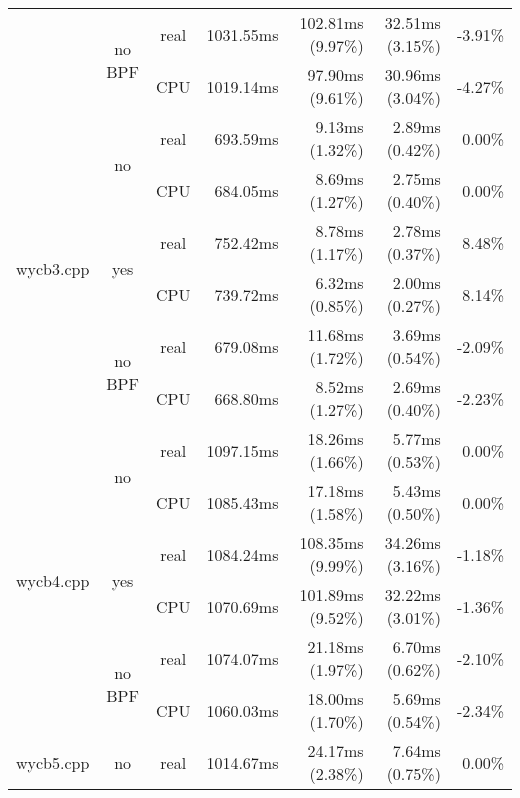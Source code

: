 \documentclass[en]{pracamgr}
\begin{document}
\begin{appendices}
\begin{small}
\begin{longtable}{|l|c|c|r|r|r|r|}
                            \cline{2-7}
                            & \multirow{2}{*}{no BPF} & real & 1031.55ms & 102.81ms (9.97\%) & 32.51ms (3.15\%) & -3.91\% \\*
                            &                         & CPU  & 1019.14ms & 97.90ms (9.61\%) & 30.96ms (3.04\%) & -4.27\% \\
\hline
\multirow{6}{*}{wycb3.cpp}  & \multirow{2}{*}{no}     & real & 693.59ms & 9.13ms (1.32\%) & 2.89ms (0.42\%) & 0.00\% \\*
                            &                         & CPU  & 684.05ms & 8.69ms (1.27\%) & 2.75ms (0.40\%) & 0.00\% \\*
                            \cline{2-7}
                            & \multirow{2}{*}{yes}    & real & 752.42ms & 8.78ms (1.17\%) & 2.78ms (0.37\%) & 8.48\% \\*
                            &                         & CPU  & 739.72ms & 6.32ms (0.85\%) & 2.00ms (0.27\%) & 8.14\% \\*
                            \cline{2-7}
                            & \multirow{2}{*}{no BPF} & real & 679.08ms & 11.68ms (1.72\%) & 3.69ms (0.54\%) & -2.09\% \\*
                            &                         & CPU  & 668.80ms & 8.52ms (1.27\%) & 2.69ms (0.40\%) & -2.23\% \\
\hline
\multirow{6}{*}{wycb4.cpp}  & \multirow{2}{*}{no}     & real & 1097.15ms & 18.26ms (1.66\%) & 5.77ms (0.53\%) & 0.00\% \\*
                            &                         & CPU  & 1085.43ms & 17.18ms (1.58\%) & 5.43ms (0.50\%) & 0.00\% \\*
                            \cline{2-7}
                            & \multirow{2}{*}{yes}    & real & 1084.24ms & 108.35ms (9.99\%) & 34.26ms (3.16\%) & -1.18\% \\*
                            &                         & CPU  & 1070.69ms & 101.89ms (9.52\%) & 32.22ms (3.01\%) & -1.36\% \\*
                            \cline{2-7}
                            & \multirow{2}{*}{no BPF} & real & 1074.07ms & 21.18ms (1.97\%) & 6.70ms (0.62\%) & -2.10\% \\*
                            &                         & CPU  & 1060.03ms & 18.00ms (1.70\%) & 5.69ms (0.54\%) & -2.34\% \\
\hline
\multirow{6}{*}{wycb5.cpp}  & \multirow{2}{*}{no}     & real & 1014.67ms & 24.17ms (2.38\%) & 7.64ms (0.75\%) & 0.00\% \\*

\end{longtable}
\end{small}
\end{appendices}
\end{document}
